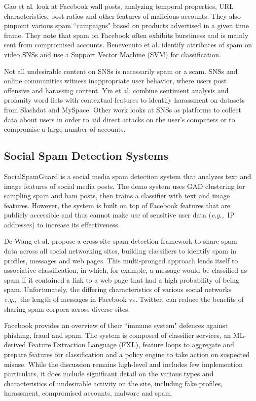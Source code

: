 \documentclass[preprint]{acm_proc_article-sp}
\newcommand{\eg}{{\em e.g.,}~}
\begin{document}
Gao et al. \cite{gao} look at Facebook wall posts, analyzing temporal properties, 
URL characteristics, post ratios and other features of malicious accounts. They 
also pinpoint various spam ``campaigns" based on products advertised in a given 
time frame. They note that spam on Facebook often exhibits burstiness and is mainly 
sent from compromised accounts. Benevenuto et al. \cite{benevenuto} identify 
attributes of spam on video SNSs and use a Support Vector Machine (SVM) for classification.

Not all undesirable content on SNSs is necessarily spam or a scam. SNSs and 
online communities witness inappropriate user behavior, where users post offensive 
and harassing content. Yin et al. \cite{yin} combine sentiment analysis and profanity 
word lists with contextual features to identify harassment on datasets from Slashdot 
and MySpace. Other work looks at SNSs as platforms to collect data about users in 
order to aid direct attacks on the user's computers or to compromise a large number of accounts. \cite{patsakis, huber}

\subsection{Social Spam Detection Systems}

SocialSpamGuard \cite{jin} is a social media spam detection system that analyzes 
text and image features of social media posts. The demo system uses GAD 
clustering \cite{jingad} for sampling spam and ham posts, then trains a 
classifier with text and image features. However, the system is built on top 
of Facebook features that are publicly accessible and thus cannot make use of 
sensitive user data (\eg IP addresses) to increase its effectiveness. 

De Wang et al. \cite{wang} propose a cross-site spam detection framework to share 
spam data across all social networking sites, building classifiers to identify spam 
in profiles, messages and web pages. This multi-pronged approach lends itself to 
associative classification, in which, for example, a message would be classified as 
spam if it contained a link to a web page that had a high probability of being spam. 
Unfortunately, the differing characteristics of various social networks \eg the length 
of messages in Facebook vs. Twitter, can reduce the benefits of sharing spam corpora across diverse sites.

Facebook \cite{stein} provides an overview of their ``immune system" defences 
against phishing, fraud and spam. The system is composed of classifier services, an 
ML-derived Feature Extraction Language (FXL), feature loops to aggregate and prepare 
features for classification and a policy engine to take action on suspected misuse. While 
the discussion remains high-level and includes few implemention particulars, it does 
include significant detail on the various types and characteristics of undesirable 
activity on the site, including fake profiles, harassment, compromised accounts, malware and spam. 
\end{document}
